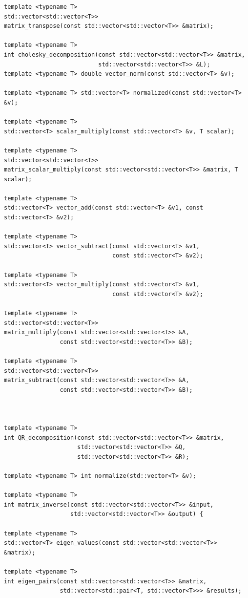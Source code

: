\documentclass[zavrsnirad, upload]{fer}
\begin{document}
\begin{lstlisting}[caption={Metode implementirane u matematičkom okviru}, label={lst:cpp_example}]
template <typename T>
std::vector<std::vector<T>>
matrix_transpose(const std::vector<std::vector<T>> &matrix);

template <typename T>
int cholesky_decomposition(const std::vector<std::vector<T>> &matrix,
                           std::vector<std::vector<T>> &L);
template <typename T> double vector_norm(const std::vector<T> &v);

template <typename T> std::vector<T> normalized(const std::vector<T> &v);

template <typename T>
std::vector<T> scalar_multiply(const std::vector<T> &v, T scalar);

template <typename T>
std::vector<std::vector<T>>
matrix_scalar_multiply(const std::vector<std::vector<T>> &matrix, T scalar);

template <typename T>
std::vector<T> vector_add(const std::vector<T> &v1, const std::vector<T> &v2);

template <typename T>
std::vector<T> vector_subtract(const std::vector<T> &v1,
                               const std::vector<T> &v2);

template <typename T>
std::vector<T> vector_multiply(const std::vector<T> &v1,
                               const std::vector<T> &v2);

template <typename T>
std::vector<std::vector<T>>
matrix_multiply(const std::vector<std::vector<T>> &A,
                const std::vector<std::vector<T>> &B);

template <typename T>
std::vector<std::vector<T>>
matrix_subtract(const std::vector<std::vector<T>> &A,
                const std::vector<std::vector<T>> &B);



template <typename T>
int QR_decomposition(const std::vector<std::vector<T>> &matrix,
                     std::vector<std::vector<T>> &Q,
                     std::vector<std::vector<T>> &R);

template <typename T> int normalize(std::vector<T> &v);

template <typename T>
int matrix_inverse(const std::vector<std::vector<T>> &input,
                   std::vector<std::vector<T>> &output) {

template <typename T>
std::vector<T> eigen_values(const std::vector<std::vector<T>> &matrix);

template <typename T>
int eigen_pairs(const std::vector<std::vector<T>> &matrix,
                std::vector<std::pair<T, std::vector<T>>> &results);
\end{lstlisting}
\end{document}
